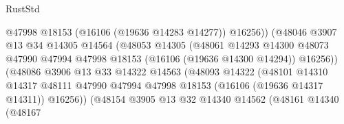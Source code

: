 \begin{lexlean}{RustStd}
\begin{coremodule}
                                            @47998
                                            @18153
                                            (@16106 (@19636 @14283 @14277))
                                            @16256))
                                        (@48046
                                          @3907
                                          @13
                                          @34
                                          @14305
                                          @14564
                                          (@48053
                                            @14305
                                            (@48061
                                              @14293
                                              @14300
                                              @48073
                                              @47990
                                              @47994
                                              @47998
                                              @18153
                                              (@16106 (@19636 @14300 @14294))
                                              @16256))
                                          (@48086
                                            @3906
                                            @13
                                            @33
                                            @14322
                                            @14563
                                            (@48093
                                              @14322
                                              (@48101
                                                @14310
                                                @14317
                                                @48111
                                                @47990
                                                @47994
                                                @47998
                                                @18153
                                                (@16106 (@19636 @14317 @14311))
                                                @16256))
                                            (@48154
                                              @3905
                                              @13
                                              @32
                                              @14340
                                              @14562
                                              (@48161
                                                @14340
                                                (@48167

\end{coremodule}
\end{lexlean}
